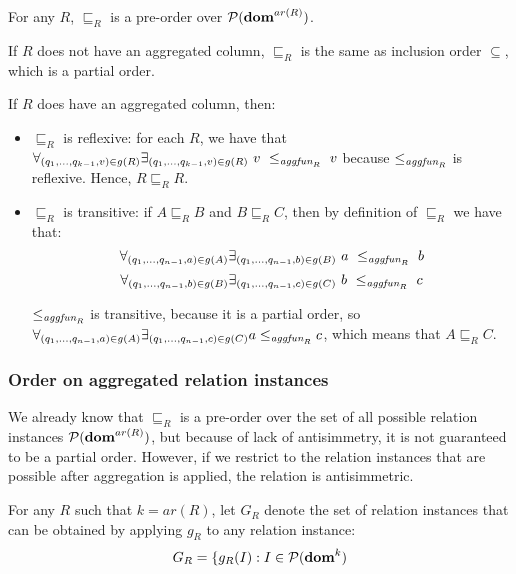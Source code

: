 \begin{lem}
For any $R$, $\sqsubseteq_R$ is a pre-order over $\mathcal{P}({\bf dom}^{ar(R)})$.
\end{lem}\label{lem:preorder}

\begin{prof}

If $R$ does not have an aggregated column, $\sqsubseteq_R$ is the same as inclusion order $\subseteq$, which is a partial order.

If $R$ does have an aggregated column, then:

\begin{itemize}
\item $\sqsubseteq_R$ is reflexive: for each $R$, we have that  $\forall_{(q_1, ..., q_{k-1}, v) \in g(R)} \exists_{(q_1, ..., q_{k-1}, v) \in g(R)}~v~\le_{\textit{aggfun}_R}~v$ because $\le_{\textit{aggfun}_R}$ is reflexive. Hence, $R \sqsubseteq_R R$.
\item $\sqsubseteq_R$ is transitive: if $A \sqsubseteq_R B$ and $B \sqsubseteq_R  C$, then by definition of $\sqsubseteq_R$ we have that: $$\forall_{(q_1, ..., q_{n-1}, a) \in g(A)} \exists_{(q_1, ..., q_{n-1}, b) \in g(B)}~a~\le_{\textit{aggfun}_R}~b $$ $$\forall_{(q_1, ..., q_{n-1}, b) \in g(B)} \exists_{(q_1, ..., q_{n-1}, c) \in g(C)}~b~\le_{\textit{aggfun}_R}~c$$

$\le_{\textit{aggfun}_R}$ is transitive, because it is a partial order, so $\forall_{(q_1, ..., q_{n-1}, a) \in g(A)} \exists_{(q_1, ..., q_{n-1}, c) \in g(C)} a \le_{\textit{aggfun}_R} c $, which means that $A \sqsubseteq_R C$.
\end{itemize}

\end{prof}

\subsubsection{Order on aggregated relation instances}

We already know that $\sqsubseteq_R$ is a pre-order over the set of all possible relation instances $\mathcal{P}({\bf dom}^{ar(R)})$, but because of lack of antisimmetry, it is not guaranteed to be a partial order. However, if we restrict to the relation instances that are possible after aggregation is applied, the relation is antisimmetric.

For any $R$ such that $k=ar(R)$, let $G_R$ denote the set of relation instances that can be obtained by applying $g_R$ to any relation instance:
$$G_R = \{g_R(I): I \in \mathcal{P}({\bf dom}^k)$$


